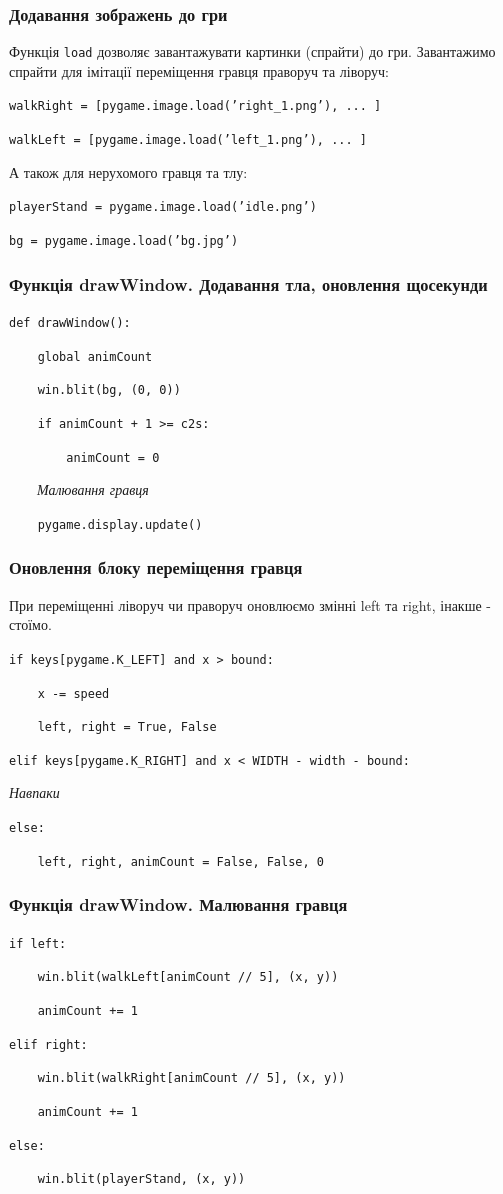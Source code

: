 \begin{frame}
\frametitle{Додавання зображень до гри}
Функція \texttt{load} дозволяє завантажувати картинки (спрайти) до гри. Завантажимо спрайти для імітації переміщення гравця праворуч та ліворуч:

\texttt{walkRight = [pygame.image.load('right\_1.png'), ... ]}

\texttt{walkLeft = [pygame.image.load('left\_1.png'), ... ]}
 
А також для нерухомого гравця та тлу:
 
\texttt{playerStand = pygame.image.load('idle.png')}

\texttt{bg = pygame.image.load('bg.jpg')} 
\end{frame}

\begin{frame}
\frametitle{Функція drawWindow. Додавання тла, оновлення щосекунди}
\texttt{def drawWindow():}

\texttt{~~~~global animCount}

\texttt{~~~~win.blit(bg, (0, 0))}

\texttt{~~~~if animCount + 1 >= c2s:} 

\texttt{~~~~~~~~animCount = 0}
    
~~~~\textit{Малювання гравця}
        
\texttt{~~~~pygame.display.update()}    
\end{frame}

\begin{frame}
\frametitle{Оновлення блоку переміщення гравця}
При переміщенні ліворуч чи праворуч оновлюємо змінні left та right, інакше - стоїмо.

\texttt{if keys[pygame.K\_LEFT] and x > bound:}

\texttt{~~~~x -= speed}

\texttt{~~~~left, right = True, False}

\texttt{elif keys[pygame.K\_RIGHT] and x < WIDTH - width - bound:}
        
\textit{Навпаки}        
        
\texttt{else:}

\texttt{~~~~left, right, animCount = False, False, 0}

\end{frame}

\begin{frame}
\frametitle{Функція drawWindow. Малювання гравця}
\texttt{if left:}

\texttt{~~~~win.blit(walkLeft[animCount // 5], (x, y))}

\texttt{~~~~animCount += 1}
    
\texttt{elif right:}

\texttt{~~~~win.blit(walkRight[animCount // 5], (x, y))}

\texttt{~~~~animCount += 1}
    
\texttt{else:}

\texttt{~~~~win.blit(playerStand, (x, y))}
\end{frame}

